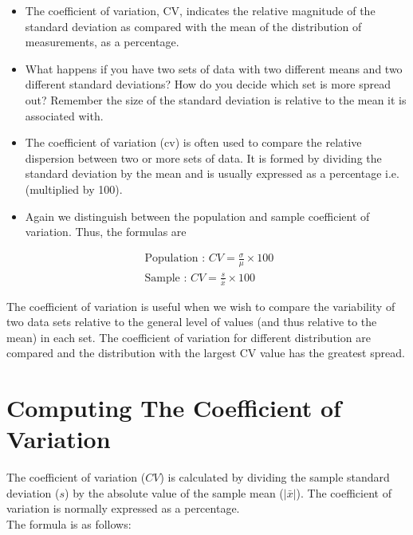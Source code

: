 \documentclass[]{report}
\begin{document}
\begin{itemize}
	\item The coefficient of variation, CV, indicates the relative magnitude of the standard deviation as compared
	with the mean of the distribution of measurements, as a percentage.
	
	\item What happens if you have two sets of data with two different means and two different standard deviations? How do you decide which set is more spread out? Remember the size of the standard deviation is relative to the mean it is associated with.
	
	\item The coefficient of variation (cv) is often used to compare the relative dispersion between two or more sets of data. It is formed by dividing the standard deviation by the mean and is usually expressed as a percentage i.e. (multiplied by 100). 
	\item Again we distinguish between the population and sample coefficient of variation. Thus, the formulas are
\end{itemize}

\begin{eqnarray*}
	\mbox{ Population : } CV = \frac{\sigma}{\mu } \times 100 \\
	\mbox{ Sample : } CV = \frac{s}{\bar{x}} \times 100
\end{eqnarray*}

The coefficient of variation is useful when we wish to compare the variability of two data sets relative to the general level of values (and thus relative to the mean) in each set. The coefficient of variation for different distribution are compared and the distribution with the largest CV value has the greatest spread.











\section{Computing The Coefficient of Variation}

The coefficient of variation ($CV$) is calculated by dividing the sample standard deviation ($s$) by the absolute value of the sample mean ($|\bar{x}|$). The coefficient of variation is normally expressed as a percentage. \\ \bigskip The formula is as follows:\\
\end{document}
